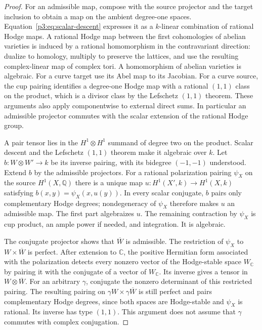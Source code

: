 \documentclass[11pt]{article}
\newcommand{\Q}{\mathbb Q}
\newcommand{\C}{\mathbb C}
\numberwithin{equation}{section}
\begin{document}
\begin{proof}
For an admissible map, compose with the source projector and the
target inclusion to obtain a map on the ambient degree-one spaces.
Equation~\eqref{p3:eq:scalar-descent} expresses it as a $k$-linear
combination of rational Hodge maps.  A rational Hodge map between
the first cohomologies of abelian varieties is induced by a rational
homomorphism in the contravariant direction: dualize to homology,
multiply to preserve the lattices, and use the resulting complex-linear
map of complex tori.  A homomorphism of abelian varieties is algebraic.
For a curve target use its Abel map to its Jacobian.  For a curve
source, the cup pairing identifies a degree-one Hodge map with a
rational $(1,1)$ class on the product, which is a divisor class by
the Lefschetz $(1,1)$ theorem.  These arguments also apply componentwise
to external direct sums.  In particular an admissible projector
commutes with the scalar extension of the rational Hodge group.

A pair tensor lies in the $H^1\otimes H^1$ summand of degree two
on the product.  Scalar descent and the Lefschetz $(1,1)$ theorem
make it algebraic over $k$.  Let $b:W\otimes W'\to k$ be its
inverse pairing, with its bidegree $(-1,-1)$ understood.  Extend
$b$ by the admissible projectors.  For a rational polarization
pairing $\psi_X$ on the source $H^1(X,\Q)$ there is a unique map
$u:H^1(X',k)\to H^1(X,k)$ satisfying
$b(x,y)=\psi_X(x,u(y))$.  In every scalar conjugate, $b$ pairs
only complementary Hodge degrees; nondegeneracy of $\psi_X$
therefore makes $u$ an admissible map.  The first part algebraizes
$u$.  The remaining contraction by $\psi_X$ is cup product, an
ample power if needed, and integration.  It is algebraic.

The conjugate projector shows that $\overline W$ is admissible.
The restriction of $\psi_X$ to $W\times\overline W$ is perfect.
After extension to $\C$, the positive Hermitian form associated
with the polarization detects every nonzero vector of the Hodge-stable
space $W_\C$ by pairing it with the conjugate of a vector of
$W_\C$.  Its inverse gives a tensor in $W\otimes\overline W$.
For an arbitrary $\gamma$, conjugate the nonzero determinant of
this restricted pairing.  The resulting pairing on
$\gamma W\times\gamma\overline W$ is still perfect and pairs
complementary Hodge degrees, since both spaces are Hodge-stable
and $\psi_X$ is rational.  Its inverse has type $(1,1)$.
This argument does not assume that $\gamma$ commutes with complex
conjugation.
\end{proof}
\end{document}
